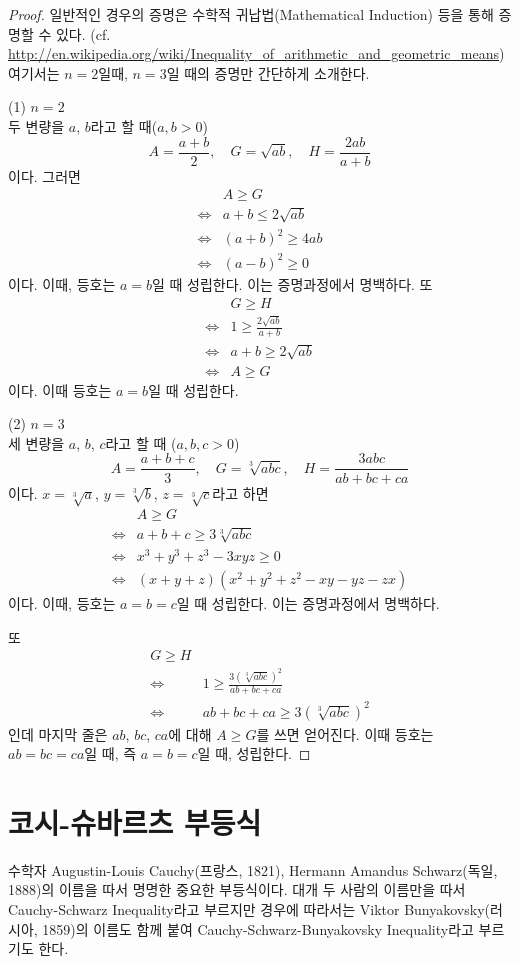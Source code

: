 \documentclass{article}
\begin{document}
\begin{proof}
일반적인 경우의 증명은 수학적 귀납법(Mathematical Induction) 등을 통해 증명할 수 있다.
(cf. \url{http://en.wikipedia.org/wiki/Inequality_of_arithmetic_and_geometric_means})
여기서는 \(n=2\)일때, \(n=3\)일 때의 증명만 간단하게 소개한다.

(1) \(n=2\)\\
두 변량을 \(a\), \(b\)라고 할 때(\(a,b>0\))
\[A=\frac{a+b}2,\quad G=\sqrt{ab},\quad H=\frac{2ab}{a+b}\]
이다.
그러면
\begin{align*}
&A\ge G\\
\iff&a+b\le2\sqrt{ab}\\
\iff&(a+b)^2\ge 4ab\\
\iff&(a-b)^2\ge0
\end{align*}
이다.
이때, 등호는 \(a=b\)일 때 성립한다.
이는 증명과정에서 명백하다.
또
\begin{align*}
&G\ge H\\
\iff&1\ge\frac{2\sqrt{ab}}{a+b}\\
\iff&a+b\ge2\sqrt{ab}\\
\iff&A\ge G
\end{align*}
이다.
이때 등호는 \(a=b\)일 때 성립한다.

(2) \(n=3\)\\
세 변량을 \(a\), \(b\), \(c\)라고 할 때 (\(a,b,c>0\))
\[A=\frac{a+b+c}3,\quad G=\sqrt[3]{abc},\quad H=\frac{3abc}{ab+bc+ca}\]
이다.
\(x=\sqrt[3]a\), \(y=\sqrt[3]b\), \(z=\sqrt[3]c\)라고 하면
\begin{align*}
&A\ge G\\
\iff&a+b+c\ge3\sqrt[3]{abc}\\
\iff&x^3+y^3+z^3-3xyz\ge0\\
\iff&(x+y+z)(x^2+y^2+z^2-xy-yz-zx)
\end{align*}
이다.
이때, 등호는 \(a=b=c\)일 때 성립한다.
이는 증명과정에서 명백하다.

또
\begin{align*}
G\ge H\\
\iff&1\ge\frac{3(\sqrt[3]{abc})^2}{ab+bc+ca}\\
\iff&ab+bc+ca\ge3(\sqrt[3]{abc})^2
\end{align*}
인데 마지막 줄은 \(ab\), \(bc\), \(ca\)에 대해 \(A\ge G\)를 쓰면 얻어진다.
이때 등호는 \(ab=bc=ca\)일 때, 즉 \(a=b=c\)일 때, 성립한다.
\end{proof}

\section{코시-슈바르츠 부등식}
수학자 Augustin-Louis Cauchy(프랑스, 1821), Hermann Amandus Schwarz(독일, 1888)의 이름을 따서 명명한 중요한 부등식이다.
대개 두 사람의 이름만을 따서 Cauchy-Schwarz Inequality라고 부르지만 경우에 따라서는 Viktor Bunyakovsky(러시아, 1859)의 이름도 함께 붙여 Cauchy-Schwarz-Bunyakovsky Inequality라고 부르기도 한다.
\end{document}
